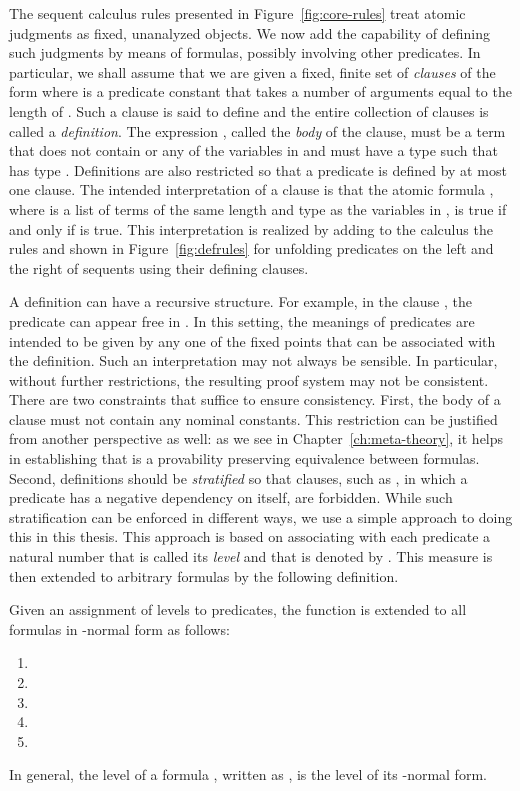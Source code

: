 The sequent calculus rules presented in Figure~\ref{fig:core-rules}
treat atomic judgments as fixed, unanalyzed objects.
We now add the capability of defining such judgments by means of
formulas, possibly involving other predicates. In particular, we shall
assume that we are given a
fixed, finite set of \emph{clauses} of the
form  where 
is a predicate constant that takes a number of arguments equal to the
length of . Such a clause is said to define  and the
entire collection of clauses is called a {\em
  definition}. The expression , called the {\em body} of the
clause, must be a term that does not contain  or
any of the variables in  and must have a type such that
 has type .  Definitions are also restricted so that
a predicate is defined by at most one clause.
The intended interpretation of a clause  is that the atomic
formula , where  is a list of terms of the same
length and type as the variables in , is true if and only if
 is true.
This interpretation is realized by adding to the calculus the rules
 and  shown in Figure~\ref{fig:defrules} for unfolding
predicates on the left and the right of sequents using their defining
clauses.

A definition can have a recursive structure. For example, in the clause
, the predicate
 can appear free in .  In this setting, the meanings
of predicates are intended to be given by any one of the fixed points
that can be associated with the definition.  Such an interpretation may
not always be sensible. In particular, without further restrictions,
the resulting proof system may not be consistent.  There are two
constraints that suffice to ensure consistency. First, the body of a
clause must not contain any nominal constants. This restriction
can be justified from another perspective as well: as we see in
Chapter~\ref{ch:meta-theory}, it helps in establishing that 
is a provability preserving equivalence between formulas. Second, definitions
should be {\em stratified} so that clauses, such as , in which a predicate has a negative dependency on
itself, are forbidden.  While such stratification can be enforced in
different ways, we use a simple approach to doing this in this
thesis. This approach is based on associating with each predicate 
a natural number that is called its {\em level} and that is denoted
by .  This measure is then extended to arbitrary formulas by
the following definition.
\begin{definition}
Given an assignment of levels to predicates, the function  is
extended to all formulas in -normal form as follows:
\begin{enumerate}
\item 
\item 
\item 
\item 
\item 
\end{enumerate}
In general, the level of a formula , written as , is the
level of its -normal form.
\end{definition}

